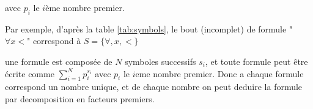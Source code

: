 \documentclass[11pt, final]{article}
\begin{document}
avec $p_i$ le $i$ème nombre premier.

Par exemple, d'après la table \ref{tab:symbols}, le bout (incomplet) de formule "$\forall x < $" correspond à $S=\{\forall, x, < \}$



une formule est composée de $N$ symboles successifs $s_i$, et toute formule peut être écrite comme $\sum_{i=1}^{N} p_i^{s_i}$ avec $p_i$ le $i$eme nombre premier. Donc a chaque formule correspond un nombre unique, et de chaque nombre on peut deduire la formule par decomposition en facteurs premiers.

%
%
\end{document}
